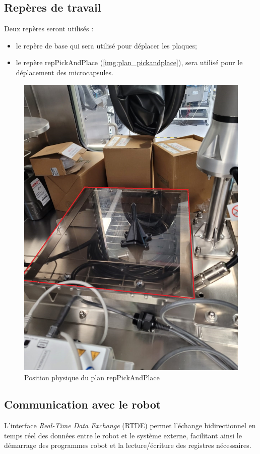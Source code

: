 \subsection{Repères de travail}
Deux repères seront utilisés :
\begin{itemize}
    \item le repère de base qui sera utilisé pour déplacer les plaques;
    \item le repère \og{}repPickAndPlace\fg{} (\cf \autoref{img:plan_pickandplace}), sera utilisé pour le déplacement des microcapsules.
\end{itemize}
\begin{figure}[H]
    \centering
    \includegraphics[width=\textwidth/2]{assets/figures/Hardware/plan/planPickAndPlace.jpeg}
    \caption{Position physique du plan \og{}repPickAndPlace\fg{}}
    \label{img:plan_pickandplace}
\end{figure}
\subsection{Communication avec le robot}\label{subsection:CommunicationRobot}
L'interface \textit{Real-Time Data Exchange} (RTDE) permet l'échange bidirectionnel en temps réel des données entre le robot et le système externe, facilitant ainsi le démarrage des programmes robot et la lecture/écriture des registres nécessaires.

